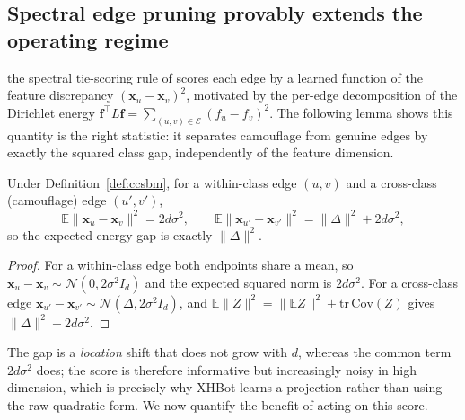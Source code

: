 \documentclass[../elsevier.tex]{subfiles}
\begin{document}
\subsection{Spectral edge pruning provably extends the operating regime}
\label{sec:sgtr-theory}

the spectral tie-scoring rule of \citet{dang2026xhbot} scores each edge by a learned function of the feature
discrepancy $(\mathbf{x}_u - \mathbf{x}_v)^2$, motivated by the per-edge
decomposition of the Dirichlet energy $\mathbf{f}^\top L \mathbf{f} =
\sum_{(u,v)\in\mathcal{E}} (f_u-f_v)^2$. The following lemma shows this quantity is
the right statistic: it separates camouflage from genuine edges by exactly the
squared class gap, independently of the feature dimension.

\begin{lemma}
\label{lem:energy}
Under Definition~\ref{def:ccsbm}, for a within-class edge $(u,v)$ and a
cross-class (camouflage) edge $(u',v')$,
\begin{equation}
    \mathbb{E}\bigl\|\mathbf{x}_u - \mathbf{x}_v\bigr\|^2 = 2d\sigma^2,
    \qquad
    \mathbb{E}\bigl\|\mathbf{x}_{u'} - \mathbf{x}_{v'}\bigr\|^2 = \|\Delta\|^2 + 2d\sigma^2,
\end{equation}
so the expected energy gap is exactly $\|\Delta\|^2$.
\end{lemma}

\begin{proof}
For a within-class edge both endpoints share a mean, so
$\mathbf{x}_u - \mathbf{x}_v \sim \mathcal{N}(0, 2\sigma^2 I_d)$ and the expected
squared norm is $2d\sigma^2$. For a cross-class edge
$\mathbf{x}_{u'} - \mathbf{x}_{v'} \sim \mathcal{N}(\Delta, 2\sigma^2 I_d)$, and
$\mathbb{E}\|Z\|^2 = \|\mathbb{E}Z\|^2 + \mathrm{tr}\,\mathrm{Cov}(Z)$ gives
$\|\Delta\|^2 + 2d\sigma^2$.
\end{proof}

The gap is a \emph{location} shift that does not grow with $d$, whereas the common
term $2d\sigma^2$ does; the score is therefore informative but increasingly noisy in
high dimension, which is precisely why XHBot learns a projection rather than using
the raw quadratic form. We now quantify the benefit of acting on this score.
\end{document}
